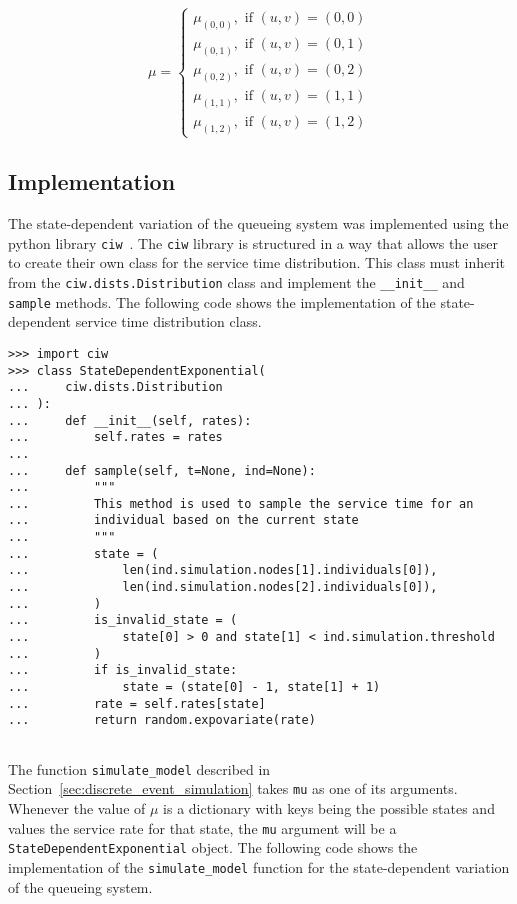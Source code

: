 \begin{equation*}
    \mu =
    \begin{cases}
        \mu_{(0, 0)}, \text{ if } (u, v) = (0, 0) \\
        \mu_{(0, 1)}, \text{ if } (u, v) = (0, 1) \\
        \mu_{(0, 2)}, \text{ if } (u, v) = (0, 2) \\
        \mu_{(1, 1)}, \text{ if } (u, v) = (1, 1) \\
        \mu_{(1, 2)}, \text{ if } (u, v) = (1, 2)
    \end{cases}
\end{equation*}



\subsection{Implementation}


The state-dependent variation of the queueing system was implemented using the
python library \texttt{ciw}~\cite{ciwpython}.
The \texttt{ciw} library is structured in a way that allows the user to create
their own class for the service time distribution.
This class must inherit from the \texttt{ciw.dists.Distribution} class and
implement the \texttt{\_\_init\_\_} and \texttt{sample} methods.
The following code shows the implementation of the state-dependent service time
distribution class.

\begin{lstlisting}[style=pystyle]
>>> import ciw
>>> class StateDependentExponential(
...     ciw.dists.Distribution
... ):
...     def __init__(self, rates):
...         self.rates = rates
... 
...     def sample(self, t=None, ind=None):
...         """
...         This method is used to sample the service time for an
...         individual based on the current state
...         """
...         state = (
...             len(ind.simulation.nodes[1].individuals[0]),
...             len(ind.simulation.nodes[2].individuals[0]),
...         )
...         is_invalid_state = (
...             state[0] > 0 and state[1] < ind.simulation.threshold
...         )
...         if is_invalid_state:
...             state = (state[0] - 1, state[1] + 1)
...         rate = self.rates[state]
...         return random.expovariate(rate)
    
\end{lstlisting}

The function \texttt{simulate\_model} described in
Section~\ref{sec:discrete_event_simulation} takes \texttt{mu} as one of its
arguments.
Whenever the value of \(\mu\) is a dictionary with keys being the possible
states and values the service rate for that state, the \texttt{mu} argument
will be a \texttt{StateDependentExponential} object.
The following code shows the implementation of the
\texttt{simulate\_model} function for the state-dependent variation of the
queueing system.

